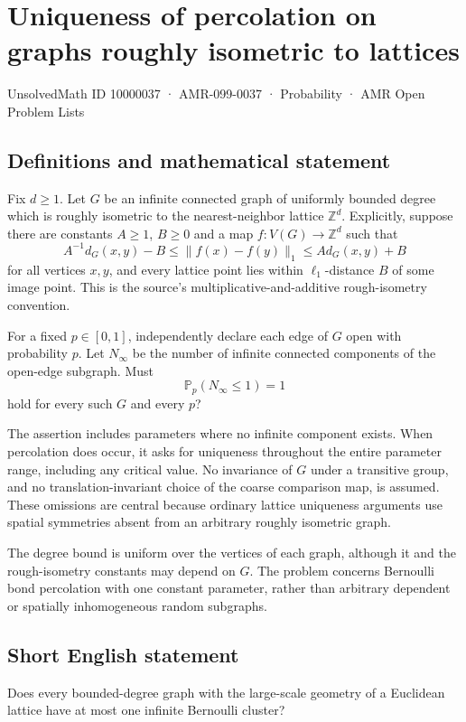 \documentclass[11pt,a4paper]{article}
\begin{document}
\section*{Uniqueness of percolation on graphs roughly isometric to lattices}\label{10000037}
{\small UnsolvedMath ID 10000037 · AMR-099-0037 · Probability · AMR Open Problem Lists}
\subsection{Definitions and mathematical statement}
Fix $d\ge1$. Let $G$ be an infinite connected graph of uniformly bounded degree which is roughly isometric to the nearest-neighbor lattice $\mathbb Z^d$. Explicitly, suppose there are constants $A\ge1$, $B\ge0$ and a map $f:V(G)\to\mathbb Z^d$ such that
\[
A^{-1}d_G(x,y)-B\le\|f(x)-f(y)\|_1\le A d_G(x,y)+B
\]
for all vertices $x,y$, and every lattice point lies within $\ell_1$-distance $B$ of some image point. This is the source's multiplicative-and-additive rough-isometry convention.

For a fixed $p\in[0,1]$, independently declare each edge of $G$ open with probability $p$. Let $N_\infty$ be the number of infinite connected components of the open-edge subgraph. Must
\[
\mathbb P_p(N_\infty\le1)=1
\]
hold for every such $G$ and every $p$?

The assertion includes parameters where no infinite component exists. When percolation does occur, it asks for uniqueness throughout the entire parameter range, including any critical value. No invariance of $G$ under a transitive group, and no translation-invariant choice of the coarse comparison map, is assumed. These omissions are central because ordinary lattice uniqueness arguments use spatial symmetries absent from an arbitrary roughly isometric graph.

The degree bound is uniform over the vertices of each graph, although it and the rough-isometry constants may depend on $G$. The problem concerns Bernoulli bond percolation with one constant parameter, rather than arbitrary dependent or spatially inhomogeneous random subgraphs.
\subsection{Short English statement}
Does every bounded-degree graph with the large-scale geometry of a Euclidean lattice have at most one infinite Bernoulli cluster?
\end{document}
